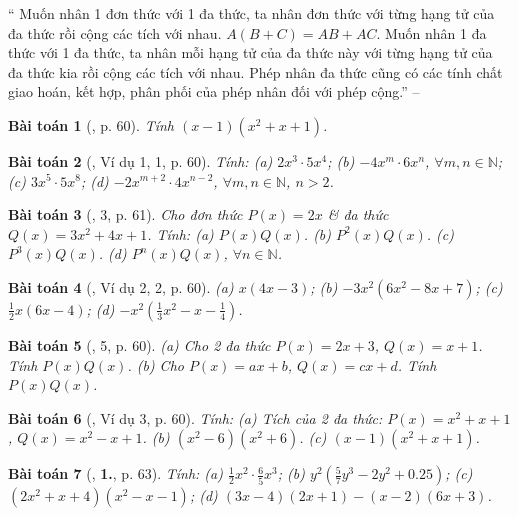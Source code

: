 \documentclass{article}
\numberwithin{equation}{section}
\newtheorem{baitoan}{Bài toán}
\begin{document}
`` Muốn nhân 1 đơn thức với 1 đa thức, ta nhân đơn thức với từng hạng tử của đa thức rồi cộng các tích với nhau. $A(B + C) = AB + AC$.  Muốn nhân 1 đa thức với 1 đa thức, ta nhân mỗi hạng tử của đa thức này với từng hạng tử của đa thức kia rồi cộng các tích với nhau.  Phép nhân đa thức cũng có các tính chất giao hoán, kết hợp, phân phối của phép nhân đối với phép cộng.'' -- \cite[Chap. III, \S4, p. 43]{Tuyen_Toan_7}

\begin{baitoan}[\cite{SGK_Toan_7_Canh_Dieu_tap_2}, p. 60]
	Tính $(x - 1)(x^2 + x + 1)$.
\end{baitoan}

\begin{baitoan}[\cite{SGK_Toan_7_Canh_Dieu_tap_2}, Ví dụ 1, 1, p. 60]
	Tính: (a) $2x^3\cdot5x^4$; (b) $-4x^m\cdot6x^n$, $\forall m,n\in\mathbb{N}$; (c) $3x^5\cdot5x^8$; (d) $-2x^{m+2}\cdot4x^{n-2}$, $\forall m,n\in\mathbb{N}$, $n > 2$.
\end{baitoan}

\begin{baitoan}[\cite{SGK_Toan_7_Canh_Dieu_tap_2}, 3, p. 61]
	Cho đơn thức $P(x) = 2x$ \& đa thức $Q(x) = 3x^2 + 4x + 1$. Tính: (a) $P(x)Q(x)$. (b) $P^2(x)Q(x)$. (c) $P^3(x)Q(x)$. (d) $P^n(x)Q(x)$, $\forall n\in\mathbb{N}$.
\end{baitoan}

\begin{baitoan}[\cite{SGK_Toan_7_Canh_Dieu_tap_2}, Ví dụ 2, 2, p. 60]
	(a) $x(4x - 3)$; (b) $-3x^2(6x^2 - 8x + 7)$; (c) $\frac{1}{2}x(6x - 4)$; (d) $-x^2\left(\frac{1}{3}x^2 - x - \frac{1}{4}\right)$.
\end{baitoan}

\begin{baitoan}[\cite{SGK_Toan_7_Canh_Dieu_tap_2}, 5, p. 60]
	(a) Cho 2 đa thức $P(x) = 2x + 3$, $Q(x) = x + 1$. Tính $P(x)Q(x)$. (b) Cho $P(x) = ax + b$, $Q(x) = cx + d$. Tính $P(x)Q(x)$.
\end{baitoan}

\begin{baitoan}[\cite{SGK_Toan_7_Canh_Dieu_tap_2}, Ví dụ 3, p. 60]
	Tính: (a) Tích của 2 đa thức: $P(x) = x^2 + x + 1$, $Q(x) = x^2 - x + 1$. (b) $(x^2 - 6)(x^2 + 6)$. (c) $(x - 1)(x^2 + x + 1)$.
\end{baitoan}

\begin{baitoan}[\cite{SGK_Toan_7_Canh_Dieu_tap_2}, \textbf{1.}, p. 63]
	Tính: (a) $\frac{1}{2}x^2\cdot\frac{6}{5}x^3$; (b) $y^2\left(\frac{5}{7}y^3 - 2y^2 + 0.25\right)$; (c) $(2x^2 + x + 4)(x^2 - x - 1)$; (d) $(3x - 4)(2x + 1) - (x - 2)(6x + 3)$.
\end{baitoan}
\end{document}
